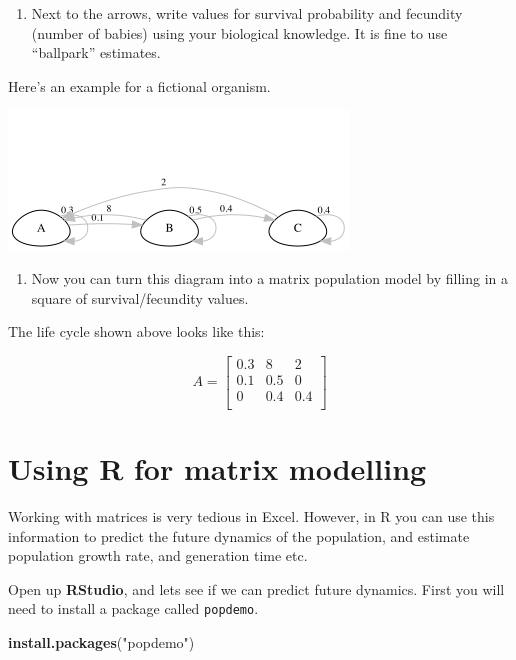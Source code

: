 \documentclass[
  a4paper]{book}
\newenvironment{Shaded}{\begin{snugshade}}{\end{snugshade}}
\newcommand{\FunctionTok}[1]{\textcolor[rgb]{0.13,0.29,0.53}{\textbf{#1}}}
\newcommand{\NormalTok}[1]{#1}
\newcommand{\StringTok}[1]{\textcolor[rgb]{0.31,0.60,0.02}{#1}}
\providecommand{\tightlist}{%
  \setlength{\itemsep}{0pt}\setlength{\parskip}{0pt}}
\begin{document}
\begin{enumerate}
\def\labelenumi{\arabic{enumi})}
\setcounter{enumi}{2}
\tightlist
\item
  Next to the arrows, write values for survival probability and fecundity (number of babies) using your biological knowledge. It is fine to use ``ballpark'' estimates.
\end{enumerate}

Here's an example for a fictional organism.

\includegraphics{tempLifeCycleDiagram.png}

\begin{enumerate}
\def\labelenumi{\arabic{enumi})}
\setcounter{enumi}{3}
\tightlist
\item
  Now you can turn this diagram into a matrix population model by filling in a square of survival/fecundity values.
\end{enumerate}

The life cycle shown above looks like this:

\[
A = \begin{bmatrix}0.3&8&2 \\0.1&0.5&0 \\0&0.4&0.4 \\\end{bmatrix}
\]

\section{Using R for matrix modelling}\label{using-r-for-matrix-modelling}

Working with matrices is very tedious in Excel. However, in R you can use this information to predict the future dynamics of the population, and estimate population growth rate, and generation time etc.

Open up \textbf{RStudio}, and lets see if we can predict future dynamics. First you will need to install a package called \texttt{popdemo}.

\begin{Shaded}
\begin{Highlighting}[]
\FunctionTok{install.packages}\NormalTok{(}\StringTok{"popdemo"}\NormalTok{)}
\end{Highlighting}
\end{Shaded}
\end{document}
